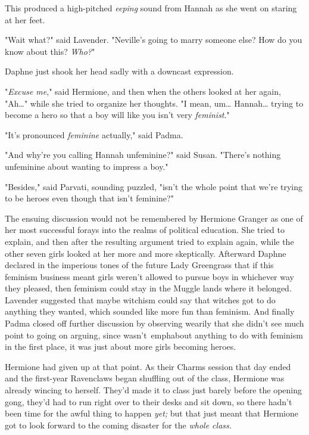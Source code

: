 This produced a high-pitched \emph{eeping} sound from Hannah as she went on 
staring at her feet.

"Wait what?" said Lavender. "Neville's going to marry someone else? How do you 
know about this? \emph{Who?}"

Daphne just shook her head sadly with a downcast expression.

"\emph{Excuse me}," said Hermione, and then when the others looked at her 
again, "Ah{\ldots}" while she tried to organize her thoughts. "I mean, 
um{\ldots} Hannah{\ldots} trying to become a hero so that a boy will like you 
isn't very \emph{feminist}."

"It's pronounced \emph{feminine} actually," said Padma.

"And why're you calling Hannah unfeminine?" said Susan. "There's nothing 
unfeminine about wanting to impress a boy."

"Besides," said Parvati, sounding puzzled, "isn't the whole point that we're 
trying to be heroes even though that isn't feminine?"

The ensuing discussion would not be remembered by Hermione Granger as one of 
her most successful forays into the realms of political education. She tried to 
explain, and then after the resulting argument tried to explain again, while 
the other seven girls looked at her more and more skeptically. Afterward Daphne 
declared in the imperious tones of the future Lady Greengrass that if this 
feminism business meant girls weren't allowed to pursue boys in whichever way 
they pleased, then feminism could stay in the Muggle lands where it belonged. 
Lavender suggested that maybe witchism could say that witches got to do 
anything they wanted, which sounded like more fun than feminism. And finally 
Padma closed off further discussion by observing wearily that she didn't see 
much point to going on arguing, since \SPHEW wasn't\ emph{about} anything 
to do with feminism in the first place, it was just about more girls becoming 
heroes.

Hermione had given up at that point.
\sbreak
As their Charms session that day ended and the first-year Ravenclaws began 
shuffling out of the class, Hermione was already wincing to herself. They'd 
made it to class just barely before the opening gong, they'd had to run right 
over to their desks and sit down, so there hadn't been time for the awful thing 
to happen \emph{yet;} but that just meant that Hermione got to look forward to 
the coming disaster for the \emph{whole class.}

